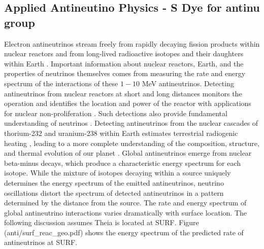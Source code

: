 \subsection{Applied Antineutino Physics - S Dye for antinu group}
Electron antineutrinos stream freely from rapidly decaying fission products within nuclear reactors and from long-lived radioactive isotopes and their daughters within Earth \cite{agm15}. Important information about nuclear reactors, Earth, and the properties of neutrinos themselves comes from measuring the rate and energy spectrum of the interactions of these $1-10$ MeV antineutrinos. Detecting antineutrinos from nuclear reactors at short \cite{nucifer15,songs07} and long \cite{nudar13,snif10} distances monitors the operation and identifies the location and power of the reactor with applications for nuclear non-proliferation \cite{adam10}. Such detections also provide fundamental understanding of neutrinos \cite{reines53,reines76,jgl08}. Detecting antineutrinos from the nuclear cascades of thorium-232 and uranium-238 within Earth \cite{kl05} estimates terrestrial radiogenic heating \cite{gando13,agostini15}, leading to a more complete understanding of the composition, structure, and thermal evolution of our planet \cite{dye_etal15}. Global antineutrinos emerge from nuclear beta-minus decays, which produce a characteristic energy spectrum for each isotope. While the mixture of isotopes decaying within a source uniquely determines the energy spectrum of the emitted antineutrinos, neutrino oscillations distort the spectrum of detected antineutrinos in a pattern determined by the distance from the source. The rate and energy spectrum of global antineutrino interactions varies dramatically with surface location. The following discussion assumes Theia is located at SURF. Figure (anti/surf_reac_geo.pdf) shows the energy spectrum of the predicted rate of antineutrinos at SURF.

